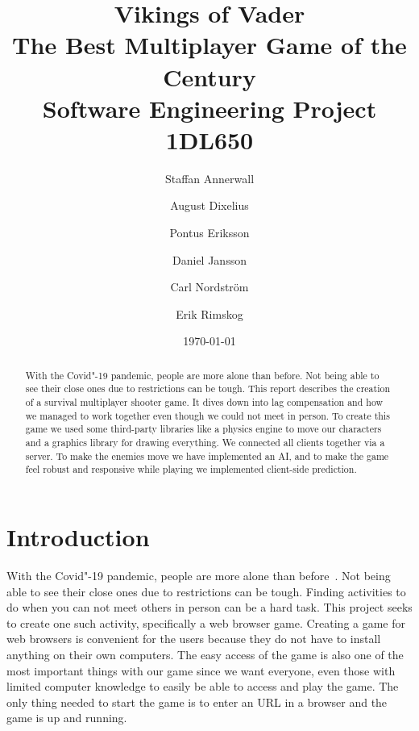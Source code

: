 \documentclass[a4paper]{article}
\title{\Huge Vikings of Vader \\ \Large The Best Multiplayer Game of the Century \\[1em] \large Software Engineering Project 1DL650}
\author{Staffan Annerwall \and August Dixelius \and Pontus Eriksson \and Daniel Jansson \and Carl Nordström \and Erik Rimskog}
\date{\today}
\begin{document}
\maketitle

\begin{abstract}
With the Covid"-19 pandemic, people are more alone than before. Not being able to see their close ones due to restrictions can be tough. This report describes the creation of a survival multiplayer shooter game. It dives down into lag compensation and how we managed to work together even though we could not meet in person.
To create this game we used some third-party libraries like a physics engine to move our characters and a graphics library for drawing everything. We connected all clients together via a server. To make the enemies move we have implemented an AI, and to make the game feel robust and responsive while playing we implemented client-side prediction.


\end{abstract}

\newpage

\tableofcontents
\newpage

\section{Introduction}

With the Covid"-19 pandemic, people are more alone than before~\cite{web:loneliness}. Not being able to see their close ones due to restrictions can be tough. Finding activities to do when you can not meet others in person can be a hard task. This project seeks to create one such activity, specifically a web browser game.
Creating a game for web browsers is convenient for the users because they do not have to install anything on their own computers. The easy access of the game is also one of the most important things with our game since we want everyone, even those with limited computer knowledge to easily be able to access and play the game. The only thing needed to start the game is to enter an URL in a browser and the game is up and running.

\end{document}
